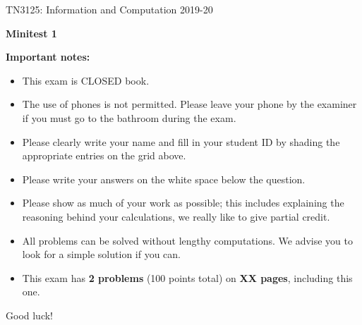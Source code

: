 \documentclass[11pt,a4paper,twoside]{article}
\begin{document}
\vspace*{-3cm}
TN3125: Information and Computation 2019-20 \\

\vspace{8cm}

\noindent \begin{center}
\textbf{{\Large Minitest 1}}\\
\par\end{center}

\vspace*{1cm}

\noindent \textbf{Important notes:}

\begin{itemize}
\item This exam is CLOSED book.
\item The use of phones is not permitted. Please leave your phone by the examiner if you must go to the bathroom during the exam.
\item Please clearly write your name and fill in your student ID by shading the appropriate entries on the grid above.
\item Please write your answers on the white space below the question. 
\item Please show as much of your work as possible; this includes explaining the reasoning behind your calculations, we really like to give partial credit.
\item All problems can be solved without lengthy computations. We advise you to look for a simple solution if you can.
\item This exam has {\bf 2 problems} (100 points total) on {\bf XX pages}, including this one.
\end{itemize}
\vspace{2cm}
Good luck!



\newpage

\newpage

\end{document}
